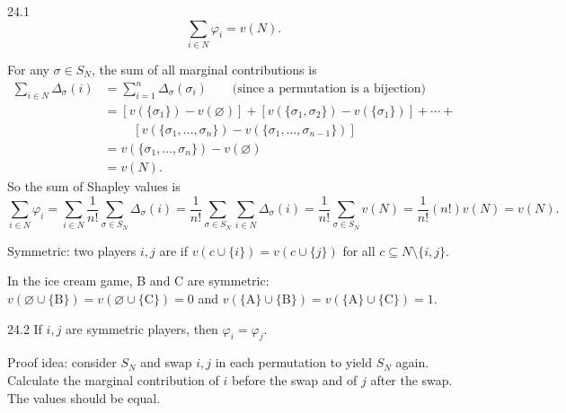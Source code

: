 \documentclass[12pt,letterpaper]{report}
\begin{document}
\begin{prop}{}{24.1}
  \[
    \sum_{i \in N} \varphi_i = v(N).
  \]
\end{prop}

\begin{thmproof}
  For any $\sigma \in S_N$, the sum of all marginal contributions is
  \begin{align*}
    \sum_{i \in N} \Delta_\sigma(i)
    &= \sum_{i = 1}^n \Delta_\sigma(\sigma_i) \qquad \text{(since a permutation is a bijection)} \\
    &= \left[ v(\{\sigma_1\}) - v(\varnothing) \right]
     + \left[ v(\{\sigma_1, \sigma_2\}) - v(\{\sigma_1\}) \right]
     + \cdots + \\
    &\phantom{={}} \quad\left[ v(\{\sigma_1, \ldots, \sigma_n\}) -
      v(\{\sigma_1, \ldots, \sigma_{n - 1}\}) \right] \\
    &= v(\{\sigma_1, \ldots, \sigma_n\}) - v(\varnothing) \\
    &= v(N).
  \end{align*}
  So the sum of Shapley values is
  \[
    \sum_{i \in N} \varphi_i
      = \sum_{i \in N} \frac{1}{n!} \sum_{\sigma \in S_N} \Delta_\sigma(i)
      = \frac{1}{n!} \sum_{\sigma \in S_N} \sum_{i \in N} \Delta_\sigma(i)
      = \frac{1}{n!} \sum_{\sigma \in S_N} v(N)
      = \frac{1}{n!} (n!) v(N)
      = v(N).
  \]
\end{thmproof}

\begin{enumcase}[start=2]
  \item
  Symmetric: two players $i, j$ are  if $v(c \cup \{i\}) = v(c \cup \{j\})$ for all
  $c \subseteq N \setminus \{i, j\}$.
\end{enumcase}

\begin{ex}
  In the ice cream game, B and C are symmetric:
  $v(\varnothing \cup \{\text{B}\}) = v(\varnothing \cup \{\text{C}\}) = 0$ and
  $v(\{\text{A}\} \cup \{\text{B}\}) = v(\{\text{A}\} \cup \{\text{C}\}) = 1$.
\end{ex}

\begin{prop}{}{24.2}
  If $i, j$ are symmetric players, then $\varphi_i = \varphi_j$.
\end{prop}

Proof idea: consider $S_N$ and swap $i, j$ in each permutation to yield $S_N$ again.
Calculate the marginal contribution of $i$ before the swap and of $j$ after the swap.
The values should be equal.
\end{document}
